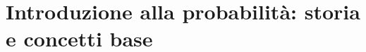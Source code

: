 \documentclass{article}
\begin{document}
\newgeometry{}

\tableofcontents
\restoregeometry

\section{Introduzione alla probabilità: storia e concetti base}

\end{document}
